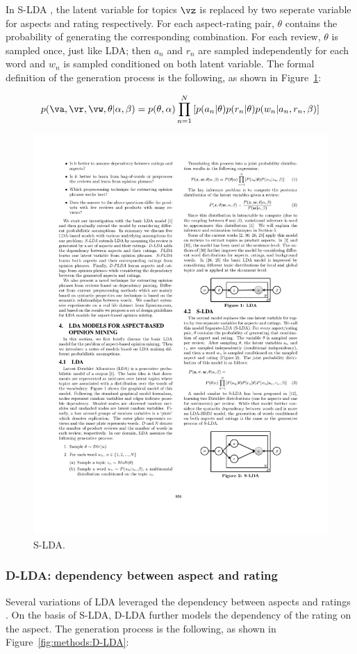 In S-LDA \cite{lakkaraju2011exploiting,moghaddam2012design}, the latent variable for topics $\vz$ is replaced by two seperate variable for aspects and rating respectively. For each aspect-rating pair, $\theta$ contains the probability of generating the corresponding combination. For each review, $\theta$ is sampled once, just like LDA; then $a_n$ and $r_n$ are sampled independently for each word and $w_n$ is sampled conditioned on both latent variable. The formal definition of the generation process is the following, as shown in Figure~\ref{fig:methods:S-LDA}:

$$p(\va, \vr, \vw, \theta | \alpha, \beta) = p(\theta, \alpha) \prod_{n=1}^N \left[ 
p(a_n| \theta) p(r_n | \theta) p(w_n | a_n, r_n, \beta)\right]$$

\begin{figure}
\centering
\includegraphics[width=0.5\columnwidth]{figures/methods/S-LDA}
\caption{S-LDA. \cite{moghaddam2012design}}
\label{fig:methods:S-LDA}
\end{figure}

\subsubsection{D-LDA: dependency between aspect and rating}

Several variations of LDA leveraged the dependency between aspects and ratings \cite{he2011automatically,jo2011aspect,li2010sentiment,lin2009joint,moghaddam2011ILDA,moghaddam2012design}.
On the basis of S-LDA, D-LDA further models the dependency of the rating on the aspect. The generation process is the following, as shown in Figure~\ref{fig:methods:D-LDA}:

